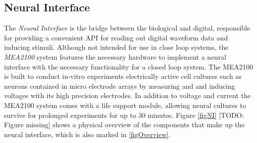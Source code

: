 \subsection{Neural Interface}
The \emph{Neural Interface} is the bridge between the biological and digital,
responsible for providing a convenient API for reading out digital waveform data
and inducing stimuli.
Although not intended for use in close loop systems, the \textit{MEA2100}
system features the necessary hardware to implement a neural interface with the
necessary functionality for a closed loop system.
The MEA2100 is built to conduct in-vitro experiments electrically active cell
cultures such as neurons contained in micro electrode arrays by measuring and
and inducing voltages with its high precision electrodes.
In addition to voltage and current the MEA2100 system comes with a life support
module, allowing neural cultures to survive for prolonged experiments for up to
30 minutes.
Figure \ref{figNI} [TODO: Figure missing] shows a physical overview of the components that make up the
neural interface, which is also marked in \ref{figOverview}.

